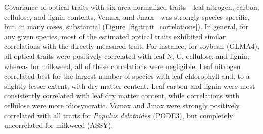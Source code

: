 Covariance of optical traits with six area-normalized traits---leaf nitrogen, carbon, cellulose, and lignin contents, Vcmax, and Jmax---was strongly species specific, but, in many cases, substantial (Figure~\ref{fig:trait_correlations}).
% 
% 
% 
In general, for any given species, most of the estimated optical traits exhibited similar correlations with the directly measured trait.
For instance, for soybean (GLMA4), all optical traits were positively correlated with leaf N, C, cellulose, and lignin, whereas for milkweed, all of these correlations were negligible.
Leaf nitrogen correlated best for the largest number of species with leaf chlorophyll and, to a slightly lesser extent, with dry matter content.
Leaf carbon and lignin were most consistently correlated with leaf dry matter content, while correlations with cellulose were more idiosyncratic.
Vcmax and Jmax were strongly positively correlated with all traits for \textit{Populus delotoides} (PODE3), but completely uncorrelated for milkweed (ASSY).


